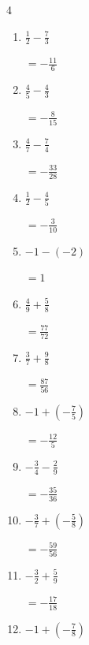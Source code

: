 \begin{multicols}{4}
\begin{enumerate}
        $\displaystyle =-\frac{43}{15}$

  \item $\displaystyle \frac{1}{2} - \frac{7}{3}$

        $\displaystyle =-\frac{11}{6}$

\columnbreak %

  \item $\displaystyle \frac{4}{5} - \frac{4}{3}$

        $\displaystyle =-\frac{8}{15}$

  \item $\displaystyle \frac{4}{7} - \frac{7}{4}$

        $\displaystyle =-\frac{33}{28}$

  \item $\displaystyle \frac{1}{2} - \frac{4}{5}$

        $\displaystyle =-\frac{3}{10}$

  \item $\displaystyle -1 - \left(-2\right)$

        $\displaystyle =1$

  \item $\displaystyle \frac{4}{9} + \frac{5}{8}$

        $\displaystyle =\frac{77}{72}$

  \item $\displaystyle \frac{3}{7} + \frac{9}{8}$

        $\displaystyle =\frac{87}{56}$

  \item $\displaystyle -1 + \left(-\frac{7}{5}\right)$

        $\displaystyle =-\frac{12}{5}$

  \item $\displaystyle -\frac{3}{4} - \frac{2}{9}$

        $\displaystyle =-\frac{35}{36}$

  \item $\displaystyle -\frac{3}{7} + \left(-\frac{5}{8}\right)$

        $\displaystyle =-\frac{59}{56}$

  \item $\displaystyle -\frac{3}{2} + \frac{5}{9}$

        $\displaystyle =-\frac{17}{18}$

\columnbreak %

  \item $\displaystyle -1 + \left(-\frac{7}{8}\right)$


\end{enumerate}
\end{multicols}
